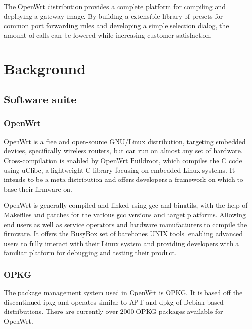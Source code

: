 \documentclass[a4paper,11pt]{kth-mag}
\begin{document}
The OpenWrt distribution provides a complete platform for compiling and deploying a gateway image.
By building a extensible library of presets for common port forwarding rules
and developing a simple selection dialog, the amount of calls can be lowered
while increasing customer satisfaction.




\chapter{Background}

\section{Software suite}

\subsection{OpenWrt}
OpenWrt is a free and open-source GNU/Linux distribution, targeting embedded devices, specifically wireless routers, but can run on almost any set of hardware.
Cross-compilation is enabled by OpenWrt Buildroot, which compiles the C code using uClibc, a lightweight C library focusing on embedded Linux systems. 
It intends to be a meta distribution and offers developers a framework on which to base their firmware on.

OpenWrt is generally compiled and linked using gcc and binutils, with the help of Makefiles and patches for the various gcc versions and target platforms.
Allowing end users as well as service operators and hardware manufacturers to compile the firmware.
It offers the BusyBox set of barebones UNIX tools, enabling advanced users to fully interact with their Linux system and providing developers with a familiar platform for debugging and testing their product.
\cite{OpenWrt:structure_design}

\subsection{OPKG}
The package management system used in OpenWrt is OPKG. It is based off the discontinued ipkg and operates similar to APT and dpkg of Debian-based distributions.
There are currently over 2000 OPKG packages available for OpenWrt.
\end{document}
